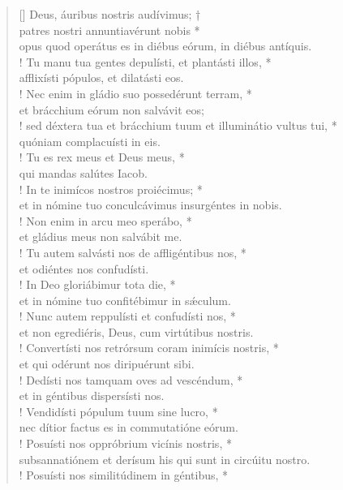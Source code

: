\begin{verse}[\versewidth]
Deus, áuribus nostris audívimus; †\\
patres nostri annuntiavérunt nobis *\\
opus quod operátus es in diébus eórum, in diébus antíquis.\\!
\vin Tu manu tua gentes depulísti, et plantásti illos, *\\
\vin afflixísti pópulos, et dilatásti eos.\\!
Nec enim in gládio suo possedérunt terram, *\\
et brácchium eórum non salvávit eos;\\!
\vin sed déxtera tua et brácchium tuum et illuminátio vultus tui, *\\
\vin quóniam complacuísti in eis.\\!
Tu es rex meus et Deus meus, *\\
qui mandas salútes Iacob.\\!
\vin In te inimícos nostros proiécimus; *\\
\vin et in nómine tuo conculcávimus insurgéntes in nobis.\\!
Non enim in arcu meo sperábo, *\\
et gládius meus non salvábit me.\\!
\vin Tu autem salvásti nos de affligéntibus nos, *\\
\vin et odiéntes nos confudísti.\\!
In Deo gloriábimur tota die, *\\
et in nómine tuo confitébimur in s\'{æ}culum.\\!
\vin Nunc autem reppulísti et confudísti nos, *\\
\vin et non egrediéris, Deus, cum virtútibus nostris.\\!
Convertísti nos retrórsum coram inimícis nostris, *\\
et qui odérunt nos diripuérunt sibi.\\!
\vin Dedísti nos tamquam oves ad vescéndum, *\\
\vin et in géntibus dispersísti nos.\\!
Vendidísti pópulum tuum sine lucro, *\\
nec dítior factus es in commutatióne eórum.\\!
\vin Posuísti nos oppróbrium vicínis nostris, *\\
\vin subsannatiónem et derísum his qui sunt in circúitu nostro.\\!
Posuísti nos similitúdinem in géntibus, *\\

\end{verse}
